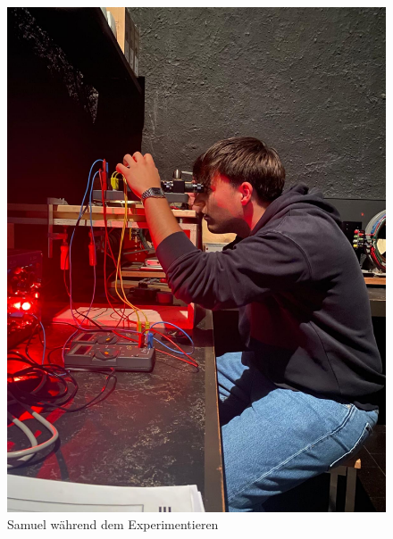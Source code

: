 \begin{figure}[h]
	\centering
	\includegraphics[scale=0.25]{bilder/pdf/bildExperimentieren.pdf}
	\caption{Samuel während dem Experimentieren}
	\label{fig:experimentieren}
\end{figure}